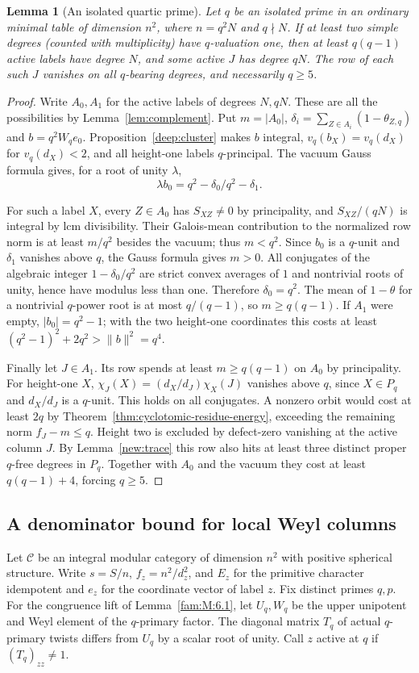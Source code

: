 \documentclass[11pt,a4paper]{article}
\numberwithin{equation}{section}
\newtheorem{lemma}[theorem]{Lemma}
\theoremstyle{remark}
\begin{document}
\begin{lemma}[An isolated quartic prime]\label{fam:M:6.8}\label{fourm:heightone}
Let $q$ be an isolated prime in an ordinary minimal table of dimension
$n^2$, where $n=q^2N$ and $q\nmid N$. If at least two simple degrees
(counted with multiplicity) have $q$-valuation one, then at least
$q(q-1)$ active labels have degree $N$, and some active $J$ has
degree $qN$. The row of each such $J$ vanishes on all $q$-bearing degrees, and
necessarily $q\ge5$.
\end{lemma}
\begin{proof}
Write $A_0,A_1$ for the active labels of degrees $N,qN$. These are all
the possibilities by Lemma~\ref{lem:complement}. Put $m=|A_0|$,
$\delta_i=\sum_{Z\in A_i}(1-\theta_{Z,q})$ and $b=q^2W_q e_0$.
Proposition~\ref{deep:cluster} makes $b$ integral,
$v_q(b_X)=v_q(d_X)$ for $v_q(d_X)<2$, and all height-one labels
$q$-principal. The vacuum Gauss formula gives, for a root of unity $\lambda$,
\[
      \lambda b_0=q^2-\delta_0/q^2-\delta_1 .
\]

For such a label $X$, every $Z\in A_0$ has $S_{XZ}\ne0$ by
principality, and $S_{XZ}/(qN)$ is integral by lcm divisibility.
Their Galois-mean contribution to the normalized row norm is at least
$m/q^2$ besides the vacuum; thus $m<q^2$. Since $b_0$ is a $q$-unit
and $\delta_1$ vanishes above $q$, the Gauss formula gives $m>0$.
All conjugates of the algebraic integer $1-\delta_0/q^2$ are strict
convex averages of $1$ and nontrivial roots of unity, hence have
modulus less than one. Therefore $\delta_0=q^2$. The mean of
$1-\theta$ for a nontrivial $q$-power root is at most $q/(q-1)$,
so $m\ge q(q-1)$. If $A_1$ were empty, $|b_0|=q^2-1$;
with the two height-one coordinates this costs at least
$(q^2-1)^2+2q^2>\|b\|^2=q^4$.

Finally let $J\in A_1$. Its row spends at least
$m\ge q(q-1)$ on $A_0$ by principality. For height-one $X$,
$\chi_J(X)=(d_X/d_J)\chi_X(J)$ vanishes above $q$, since $X\in P_q$
and $d_X/d_J$ is a $q$-unit. This holds on all conjugates.
A nonzero orbit would cost at least $2q$ by
Theorem~\ref{thm:cyclotomic-residue-energy}, exceeding the remaining
norm $f_J-m\le q$. Height two is excluded by defect-zero vanishing
at the active column $J$. By Lemma~\ref{new:trace} this row also
hits at least three distinct proper $q$-free degrees in $P_q$.
Together with $A_0$ and the vacuum they cost at least $q(q-1)+4$,
forcing $q\ge5$.
\end{proof}

\subsection{A denominator bound for local Weyl columns}\label{fam:W:sec:2}
Let $\mathcal C$ be an integral modular category of dimension $n^2$
with positive spherical structure. Write $s=S/n$, $f_z=n^2/d_z^2$,
and $E_z$ for the primitive character idempotent and $e_z$ for the coordinate
vector of label $z$. Fix distinct primes
$q,p$. For the congruence lift of Lemma~\ref{fam:M:6.1}, let $U_q,W_q$
be the upper unipotent and Weyl element of the $q$-primary factor.
The diagonal matrix $T_q$ of actual $q$-primary twists differs from
$U_q$ by a scalar root of unity. Call $z$ active at $q$ if
$(T_q)_{zz}\ne1$.
\end{document}
